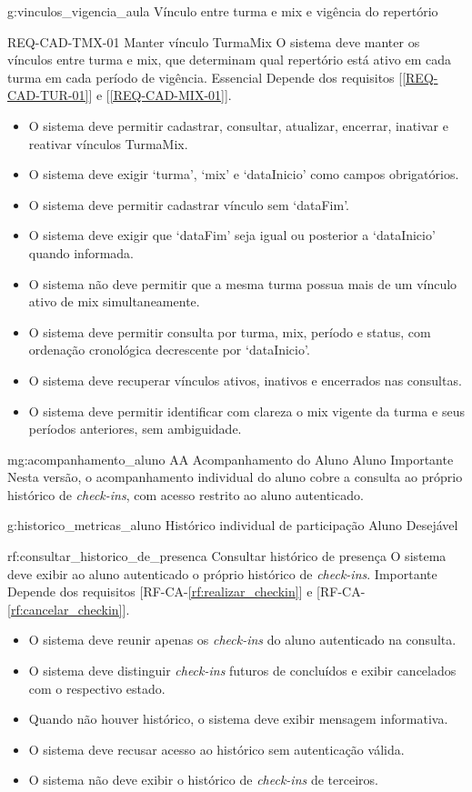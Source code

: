 \rfgruporeq
{g:vinculos_vigencia_aula}
{Vínculo entre turma e mix e vigência do repertório}


\reqfunccad
{REQ-CAD-TMX-01 Manter vínculo TurmaMix}
{O sistema deve manter os vínculos entre turma e mix, que determinam qual repertório está ativo em cada turma em cada período de vigência.}
{Essencial}
{Depende dos requisitos [\ref{REQ-CAD-TUR-01}] e [\ref{REQ-CAD-MIX-01}].}
{\begin{itemize}[leftmargin=0.6cm]
    \item O sistema deve permitir cadastrar, consultar, atualizar, encerrar, inativar e reativar vínculos TurmaMix.
    \item O sistema deve exigir `turma', `mix' e `dataInicio' como campos obrigatórios.
    \item O sistema deve permitir cadastrar vínculo sem `dataFim'.
    \item O sistema deve exigir que `dataFim' seja igual ou posterior a `dataInicio' quando informada.
    \item O sistema não deve permitir que a mesma turma possua mais de um vínculo ativo de mix simultaneamente.
    \item O sistema deve permitir consulta por turma, mix, período e status, com ordenação cronológica decrescente por `dataInicio'.
    \item O sistema deve recuperar vínculos ativos, inativos e encerrados nas consultas.
    \item O sistema deve permitir identificar com clareza o mix vigente da turma e seus períodos anteriores, sem ambiguidade.
\end{itemize}}

\rfmacrogrupo
{mg:acompanhamento_aluno}
{AA}
{Acompanhamento do Aluno}
{Aluno}
{Importante}
{Nesta versão, o acompanhamento individual do aluno cobre a consulta ao próprio histórico de \textit{check-ins}, com acesso restrito ao aluno autenticado.}

\rfgruporeqatorprio
{g:historico_metricas_aluno}
{Histórico individual de participação}
{Aluno}
{Desejável}

\reqfuncprio
{rf:consultar_historico_de_presenca}
{Consultar histórico de presença}
{O sistema deve exibir ao aluno autenticado o próprio histórico de \textit{check-ins}.}
{Importante}
{Depende dos requisitos [RF-CA-\ref{rf:realizar_checkin}] e [RF-CA-\ref{rf:cancelar_checkin}].}
{\begin{itemize}[leftmargin=0.6cm]
    \item O sistema deve reunir apenas os \textit{check-ins} do aluno autenticado na consulta.
    \item O sistema deve distinguir \textit{check-ins} futuros de concluídos e exibir cancelados com o respectivo estado.
    \item Quando não houver histórico, o sistema deve exibir mensagem informativa.
    \item O sistema deve recusar acesso ao histórico sem autenticação válida.
    \item O sistema não deve exibir o histórico de \textit{check-ins} de terceiros.
\end{itemize}}


